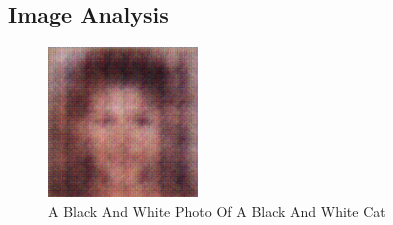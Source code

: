 \documentclass{article}%
\begin{document}
%
\subsection{Image Analysis}%
\label{subsec:ImageAnalysis}%


\begin{figure}[h!]%
\centering%
\includegraphics[width=150px]{500_fake_images/samples_5_453.png}%
\caption{A Black And White Photo Of A Black And White Cat}%
\end{figure}

%
\end{document}
